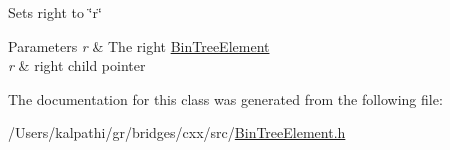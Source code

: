 Sets right to \char`\"{}r\char`\"{}
\begin{DoxyParams}{Parameters}
{\em r} & The right \mbox{\hyperlink{classbridges_1_1_bin_tree_element}{Bin\+Tree\+Element}}\\
\hline
{\em r} & right child pointer \\
\hline
\end{DoxyParams}


The documentation for this class was generated from the following file\+:\begin{DoxyCompactItemize}
\item 
/\+Users/kalpathi/gr/bridges/cxx/src/\mbox{\hyperlink{_bin_tree_element_8h}{Bin\+Tree\+Element.\+h}}\end{DoxyCompactItemize}
